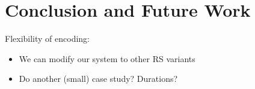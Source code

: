 
\section{Conclusion and Future Work}
Flexibility of encoding:
\begin{itemize}
\item We can modify our system to other RS variants
\item Do another (small) case study? Durations?
\end{itemize}
